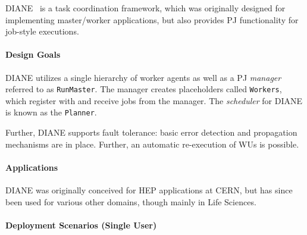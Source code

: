 \documentclass{sig-alternate}
\begin{document}
DIANE~\cite{Moscicki:908910} is a task coordination framework, which
was originally designed for implementing master/worker applications,
but also provides PJ functionality for job-style executions.

\paragraph{Design Goals}




DIANE utilizes a single hierarchy of worker agents as well as a PJ \textit{manager}
referred to as \texttt{RunMaster}.  The manager creates
placeholders called \texttt{Workers}, which register with and receive jobs from the manager.
The \textit{scheduler} for DIANE is known as the \texttt{Planner}.


Further, DIANE supports fault tolerance: basic error detection and
propagation mechanisms are in place. Further, an automatic re-execution of WUs
is possible.

\paragraph{Applications}

DIANE was originally conceived for HEP applications at CERN, but has since been
used for various other domains, though mainly in Life Sciences.

\paragraph{Deployment Scenarios (Single User)}
\end{document}
